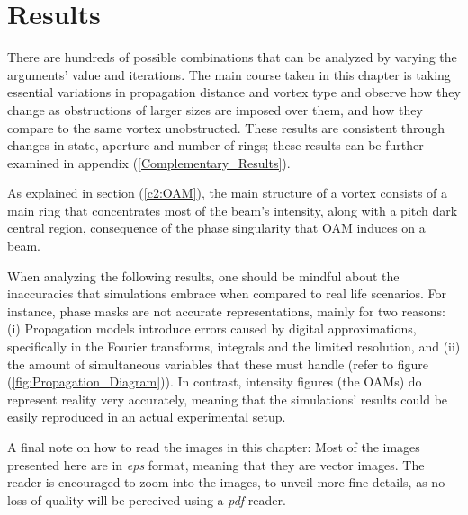 \chapter{Results} \label{Results}
\label{c4} %

There are hundreds of possible combinations that can be analyzed by varying the arguments' value and iterations. The main course taken in this chapter is taking essential variations in propagation distance and vortex type and observe how they change as obstructions of larger sizes are imposed over them, and how they compare to the same vortex unobstructed. These results are consistent through changes in state, aperture and number of rings; these results can be further examined in appendix (\ref{Complementary_Results}).


As explained in section (\ref{c2:OAM}), the main structure of a vortex consists of a main ring that concentrates most of the beam's intensity, along with a pitch dark central region, consequence of the phase singularity that OAM induces on a beam.

When analyzing the following results, one should be mindful about the inaccuracies that simulations embrace when compared to real life scenarios. For instance, phase masks are not accurate representations, mainly for two reasons: (i) Propagation models introduce errors caused by digital approximations, specifically in the Fourier transforms, integrals and the limited resolution, and (ii) the amount of simultaneous variables that these must handle (refer to figure (\ref{fig:Propagation_Diagram})). In contrast, intensity figures (the OAMs) do represent reality very accurately, meaning that the simulations' results could be easily reproduced in an actual experimental setup.

A final note on how to read the images in this chapter: Most of the images presented here are in \textit{eps} format, meaning that they are vector images. The reader is encouraged to zoom into the images, to unveil more fine details, as no loss of quality will be perceived using a \textit{pdf} reader.

